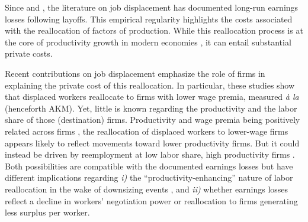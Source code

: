 

Since \cite{Jacobson1993} and \cite{Farber1993}, the literature on job displacement has documented long-run earnings losses following layoffs. This empirical regularity highlights the costs associated with the reallocation of factors of production. While this reallocation process is at the core of productivity growth in modern economies \citep{foster2001aggregate,hsieh2009misallocation}, it can entail substantial {private} costs.

Recent contributions on job displacement emphasize the role of firms in explaining the private cost of this reallocation. In particular, these studies show that displaced workers reallocate to firms with lower wage premia, measured \textit{à la} \cite{Abowd1999} (henceforth AKM). Yet, little is known regarding the productivity and the labor share of those (destination) firms. Productivity and wage premia being positively related across firms \citep[e.g.][]{card2016bargaining}, the reallocation of displaced workers to lower-wage firms appears likely to reflect movements toward lower productivity firms. But it could instead be driven by reemployment at low labor share, high productivity firms \citep{autor2020fall,aghion2022theory}. Both possibilities are compatible with the documented earnings losses but have different implications regarding \textit{i)} the ``productivity-enhancing'' nature of labor reallocation in the wake of downsizing events \citep{foster2016reallocation}, and \textit{ii)} whether earnings losses reflect a decline in workers' negotiation power or reallocation to firms generating less surplus per worker.%

